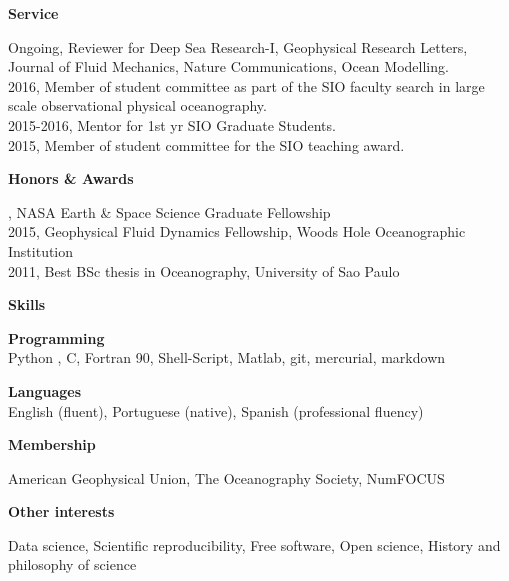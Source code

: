 \documentclass[a4paper,11pt,final]{memoir}
\newcommand{\Sep}{\vspace{1.25em}}
\newcommand{\SmallSep}{\vspace{0.5em}}
\newcommand{\CVSection}[1]
    {\Large\textbf{#1}\par
    \SmallSep\normalsize\normalfont}
\newcommand{\CVItem}[1]
    {\textbf{\color{NavyBlue} #1}}
\begin{document}
\Sep


\CVSection{Service}


Ongoing, Reviewer for Deep Sea Research-I, Geophysical Research Letters, Journal of
        Fluid Mechanics, Nature Communications, Ocean Modelling. \\

2016, Member of student committee as part of the
SIO faculty search in large scale observational physical oceanography.\\

2015-2016, Mentor for 1st yr SIO Graduate Students. \\

2015, Member of student committee for the SIO teaching award.





\Sep

\CVSection{Honors \& Awards}
2016, NASA Earth \& Space Science Graduate Fellowship\\
2015, Geophysical Fluid Dynamics Fellowship, Woods Hole Oceanographic Institution\\
2011, Best BSc thesis in Oceanography, University of Sao Paulo

\Sep

\CVSection{Skills}

\CVItem{Programming}\\
Python , C, Fortran 90, Shell-Script, Matlab, git, mercurial, markdown

\SmallSep

\CVItem{Languages}\\
English (fluent), Portuguese (native), Spanish (professional fluency)

\Sep

\CVSection{Membership}

 American Geophysical Union, The Oceanography Society, NumFOCUS

\Sep

\CVSection{Other interests}

Data science, Scientific reproducibility, Free software, Open science, History and philosophy of science

%
%
%
%
%
%
%
%
\end{document}
